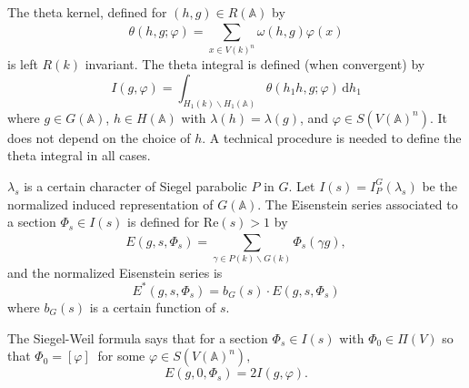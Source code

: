 \documentclass[12pt]{article}
\begin{document}
The theta kernel, defined for $\left(h, g\right) \in R\left(\mathbb{A}\right)$
by 
%
\[\theta\left(h, g; \varphi\right) = \sum_{x \in V\left(k\right)^{n}}^{}
\omega\left(h, g\right)\varphi\left(x\right)\]
%
is left $R\left(k\right)$ invariant. The theta integral is defined (when
convergent) by 
%
\[I\left(g, \varphi\right) = \int_{H_{1}\left(k\right) \backslash
H_{1}\left(\mathbb{A}\right)}^{} \theta\left(h_1h, g; \varphi\right) \,
\mathrm{d}h_{1}\]
%
where $g \in G\left(\mathbb{A}\right)$, $h \in H\left(\mathbb{A}\right)$ with
$\lambda\left(h\right) = \lambda\left(g\right)$, and $\varphi \in
S\left(V\left(\mathbb{A}\right)^{n}\right)$. It does not depend on the choice of
$h$. A technical procedure is needed to define the theta integral in all cases.

$\lambda_{s}$ is a certain character of Siegel parabolic $P$ in $G$. Let
$I\left(s\right) = I_{P}^{G}\left(\lambda_{s}\right)$ be the normalized induced
representation of $G\left(\mathbb{A}\right)$. The Eisenstein series associated
to a section $\Phi_{s} \in I\left(s\right)$ is defined for
$\text{Re}\left(s\right) > 1$ by 
%
\[E\left(g, s, \Phi_{s}\right) = \sum_{\gamma \in P\left(k\right) \backslash
G\left(k\right)}^{} \Phi_{s}\left(\gamma g\right),\]
%
and the normalized Eisenstein series is 
%
\[E^{*}\left(g, s, \Phi_{s}\right) = b_{G}\left(s\right) \cdot E\left(g, s,
\Phi_{s}\right)\]
%
where $b_{G}\left(s\right)$ is a certain function of $s$.

The Siegel-Weil formula says that for a section $\Phi_{s} \in I\left(s\right)$
with $\Phi_{0} \in \Pi\left(V\right)$ so that $\Phi_{0} =
\left[\varphi\right]^{~}$ for some $\varphi \in
S\left(V\left(\mathbb{A}\right)^{n}\right),$ 
%
\[E\left(g, 0, \Phi_{s}\right) = 2 I\left(g, \varphi\right).\]
%
\end{document}
